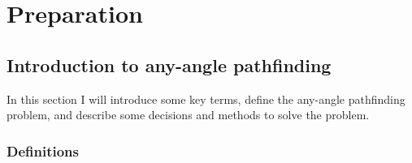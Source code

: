 \documentclass[12pt,notitlepage]{report}
\begin{document}

\cleardoublepage


\chapter{Preparation} 

\section{Introduction to any-angle pathfinding}

In this section I will introduce some key terms, define the any-angle pathfinding problem, and describe some decisions and methods to solve the problem.

\subsection{Definitions}
\end{document}
